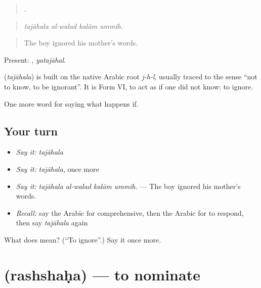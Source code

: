 \begin{quote}
   .
\end{quote}

\begin{quote}
\emph{tajāhala al-walad kalām ummih.}
\end{quote}

\begin{quote}
The boy ignored his mother's words.
\end{quote}

Present: , \emph{yatajāhal}.

\begin{cousinweb}
\textbf{} (\emph{tajāhala}) is built on the native Arabic root \emph{j-h-l}, usually traced to the sense \textquotedblleft{}not to know, to be ignorant\textquotedblright{}. It is Form VI, to act as if one did not know: to ignore.
\end{cousinweb}

\begin{grammarlens}[title={What you've built}]
One more word for saying what happens if.
\end{grammarlens}

\subsection*{Your turn}
\begin{itemize}
\raggedright
  \item \emph{Say it:} \emph{tajāhala}
  \item \emph{Say it:} \emph{tajāhala}, once more
  \item \emph{Say it:} \emph{tajāhala al-walad kalām ummih.} — The boy ignored his mother's words.
  \item \emph{Recall:} say the Arabic for comprehensive, then the Arabic for to respond, then say \emph{tajāhala} again
\end{itemize}

\begin{tcolorbox}[breakable,colback=teal!4,colframe=teal!35!black,title={Before you move on}]
What does  mean? (\textquotedblleft{}To ignore\textquotedblright{}.) Say it once more.
\end{tcolorbox}
\section[\texorpdfstring{\ar{رشح} (rashshaḥa)}{رشح (rashshaḥa)}]{ (rashshaḥa) — to nominate}

